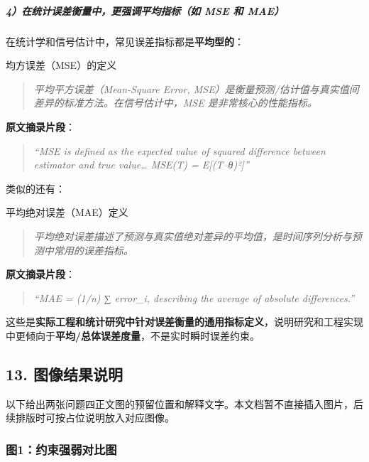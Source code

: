 \documentclass[
]{article}
\begin{document}
\subparagraph{4）在统计误差衡量中，更强调平均指标（如 MSE 和
MAE）}\label{4uxff09ux5728ux7edfux8ba1ux8befux5deeux8861ux91cfux4e2dux66f4ux5f3aux8c03ux5e73ux5747ux6307ux6807ux5982-mse-ux548c-maeuxff09}

在统计学和信号估计中，常见误差指标都是\textbf{平均型的}：

均方误差（MSE）的定义

\begin{quote}
\emph{平均平方误差（Mean-Square Error,
MSE）是衡量预测/估计值与真实值间差异的标准方法。在信号估计中，MSE
是非常核心的性能指标。}
\end{quote}

\textbf{原文摘录片段}：

\begin{quote}
\emph{``MSE is defined as the expected value of squared difference
between estimator and true value\ldots{} MSE(T) = E{[}(T--θ)²{]}''}
\end{quote}

类似的还有：

平均绝对误差（MAE）定义

\begin{quote}
\emph{平均绝对误差描述了预测与真实值绝对差异的平均值，是时间序列分析与预测中常用的误差指标。}
\end{quote}

\textbf{原文摘录片段}：

\begin{quote}
\emph{``MAE = (1/n) ∑ \textbar error\_i\textbar, describing the average
of absolute differences.''}
\end{quote}

这些是\textbf{实际工程和统计研究中针对误差衡量的通用指标定义}，说明研究和工程实现中更倾向于\textbf{平均/总体误差度量}，不是实时瞬时误差约束。

\subsection{13.
图像结果说明}\label{13-ux56feux50cfux7ed3ux679cux8bf4ux660e}

以下给出两张问题四正文图的预留位置和解释文字。本文档暂不直接插入图片，后续排版时可按占位说明放入对应图像。

\subsubsection{图1：约束强弱对比图}\label{ux56fe1ux7ea6ux675fux5f3aux5f31ux5bf9ux6bd4ux56fe}
\end{document}
